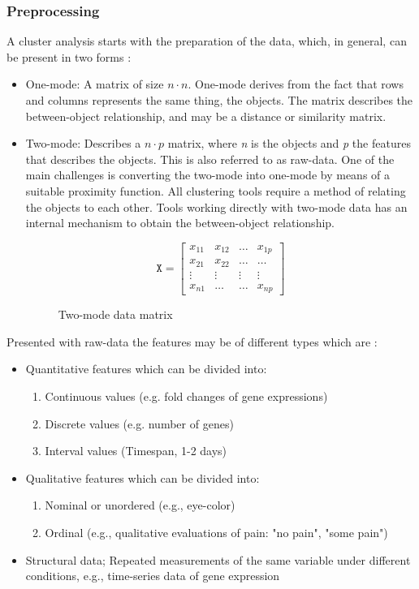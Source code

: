 \documentclass[a4paper,10pt]{article}
\theoremstyle{plain}
\theoremstyle{definition}
\begin{document}
\subsubsection{Preprocessing}
A cluster analysis starts with the preparation of the data, which, in general, can be present in two forms \cite{clusterAnalysis}:
\begin{itemize}
	\item One-mode: A matrix of size $n \cdot n$. One-mode derives from the fact that rows and columns represents the same thing, the objects. The matrix describes the between-object relationship, and may be a distance or similarity matrix.
	\item Two-mode: Describes a $n \cdot p$ matrix, where \textit{n} is the objects and \textit{p} the features that describes the objects. This is also referred to as raw-data. One of the main challenges is converting the two-mode into one-mode by means of a suitable proximity function. All clustering tools require a method of relating the objects to each other. Tools working directly with two-mode data has an internal mechanism to obtain the between-object relationship.
	 \begin{figure}[H]
	 	\centering
	 	\[
	 	\texttt{X}
	 	=
	 	\begin{bmatrix}
	 	x_{11} & x_{12} & \dots & x_{1p} \\
	 	x_{21} & x_{22} & \dots & \dots \\
	 	\vdots & \vdots & \vdots & \vdots \\
	 	x_{n1} & \dots & \dots & x_{np}
	 	\end{bmatrix}
	 	\]
	 	\caption{Two-mode data matrix}
	 	\label{fig:dataMatrix}
	 \end{figure}
\end{itemize}

Presented with raw-data the features may be of different types which are \cite{clusteringOverview}:
\begin{itemize}
	\item Quantitative features which can be divided into:
		\begin{enumerate}
			\item Continuous values (e.g. fold changes of gene expressions)
			\item Discrete values (e.g. number of genes)
			\item Interval values (Timespan, 1-2 days)
		\end{enumerate}
	\item Qualitative features which can be divided into:
		\begin{enumerate}
			\item Nominal or unordered (e.g., eye-color)
			\item Ordinal (e.g., qualitative evaluations of pain: "no pain", "some pain")
		\end{enumerate}
	\item Structural data; Repeated measurements of the same variable under different conditions, e.g., time-series data of gene expression
\end{itemize}
\end{document}
